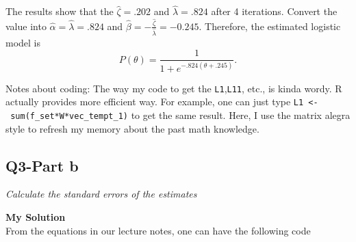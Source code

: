 \documentclass[
]{article}
\begin{document}
The results show that the \(\hat{\zeta}=.202\) and
\(\hat{\lambda}=.824\) after 4 iterations. Convert the value into
\(\hat{\alpha} = \hat{\lambda}=.824\) and
\(\hat{\beta} = -\frac{\hat{\zeta}}{\hat{\lambda}}=-0.245\). Therefore,
the estimated logistic model is
\[P(\theta)=\frac{1}{1+e^{-.824(\theta+.245)}}.\]

Notes about coding: The way my code to get the \texttt{L1},\texttt{L11},
etc., is kinda wordy. R actually provides more efficient way. For
example, one can just type
\texttt{L1\ \textless{}-\ sum(f\_set*W*vec\_tempt\_1)} to get the same
result. Here, I use the matrix alegra style to refresh my memory about
the past math knowledge.

\hypertarget{q3-part-b}{%
\subsection{Q3-Part b}\label{q3-part-b}}

\emph{Calculate the standard errors of the estimates}

\textbf{My Solution}\\
From the equations in our lecture notes, one can have the following code
\end{document}
